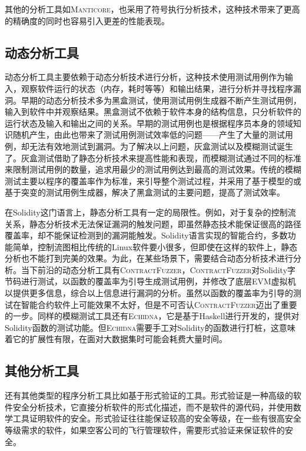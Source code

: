 其他的分析工具如\textsc{Manticore}，也采用了符号执行分析技术，这种技术带来了更高的精确度的同时也容易引入更差的性能表现。

\subsection{动态分析工具}

动态分析工具主要依赖于动态分析技术进行分析，这种技术使用测试用例作为输入，观察软件运行的状态（内存，耗时等等）和输出结果，进行分析并寻找程序漏洞。早期的动态分析技术多为黑盒测试，使用测试用例生成器不断产生测试用例，输入到软件中并观察结果。黑盒测试不依赖于软件本身的结构信息，只分析软件的运行状态及输入和输出之间的关系。早期的测试用例也是根据程序员本身的领域知识随机产生，由此也带来了测试用例测试效率低的问题——产生了大量的测试用例，却无法有效地测试到漏洞。为了解决以上问题，灰盒测试以及模糊测试诞生了。灰盒测试借助了静态分析技术来提高性能和表现，而模糊测试通过不同的标准来限制测试用例的数量，追求用最少的测试用例达到最高的测试效果。传统的模糊测试主要以程序的覆盖率作为标准，来引导整个测试过程，并采用了基于模型的或基于突变的测试用例生成器，解决了黑盒测试的主要问题，提高了测试效率。

在Solidity这门语言上，静态分析工具有一定的局限性。例如，对于复杂的控制流关系，静态分析技术无法保证漏洞的触发问题，即虽然静态技术能保证很高的路径覆盖率，却不能保证检测到的漏洞能触发。Solidity语言实现的智能合约，多数功能简单，控制流图相比传统的Linux软件要小很多，但即使在这样的软件上，静态分析也不能打到完美的效果。为此，在某些场景下，需要结合动态分析技术进行分析。当下前沿的动态分析工具有\textsc{ContractFuzzer}\cite{contractfuzzer}，\textsc{ContractFuzzer}对Solidity字节码进行测试，以函数的覆盖率为引导生成测试用例，并修改了底层EVM虚拟机以提供更多信息，综合以上信息进行漏洞的分析。虽然以函数的覆盖率为引导的测试在智能合约软件上可能效果不太好，但是不可否认\textsc{ContractFuzzer}迈出了重要的一步。同样的模糊测试工具还有\textsc{Echidna}，它是基于Haskell进行开发的，提供对Solidity函数的测试功能。但\textsc{Echidna}需要手工对Solidity的函数进行打桩，这意味着它的扩展性有限，在面对大数据集时可能会耗费大量时间。

\subsection{其他分析工具}

还有其他类型的程序分析工具比如基于形式验证的工具。形式验证是一种高级的软件安全分析技术，它直接分析软件的形式化描述，而不是软件的源代码，并使用数学工具证明软件的安全。形式验证往往能保证较高的安全等级，在一些有很高安全等级需求的软件，如果空客公司的飞行管理软件，需要形式验证来保证软件的安全。

